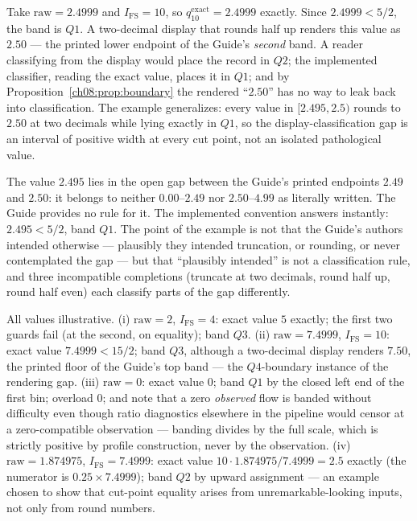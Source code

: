\begin{example}[Near-boundary value: $q_{10}^{\mathrm{exact}} = 2.4999$]\label{ch08:ex:near}
Take $\mathrm{raw} = 2.4999$ and $I_{\mathrm{FS}} = 10$, so
$q_{10}^{\mathrm{exact}} = 2.4999$ exactly. Since $2.4999 < 5/2$, the band
is $Q1$. A two-decimal display that rounds half up renders this value as
$2.50$ --- the printed lower endpoint of the Guide's \emph{second} band.
A reader classifying from the display would place the record in $Q2$; the
implemented classifier, reading the exact value, places it in $Q1$; and by
Proposition~\ref{ch08:prop:boundary} the rendered ``$2.50$'' has no way to
leak back into classification. The example generalizes: every value in
$[2.495, 2.5)$ rounds to $2.50$ at two decimals while lying exactly in
$Q1$, so the display-classification gap is an interval of positive width
at every cut point, not an isolated pathological value.
\end{example}

\begin{example}\label{ch08:ex:gap}
The value $2.495$ lies in the open gap between the Guide's printed
endpoints $2.49$ and $2.50$: it belongs to neither $0.00$--$2.49$ nor
$2.50$--$4.99$ as literally written. The Guide provides no rule for it.
The implemented convention answers instantly: $2.495 < 5/2$, band $Q1$.
The point of the example is not that the Guide's authors intended
otherwise --- plausibly they intended truncation, or rounding, or never
contemplated the gap --- but that ``plausibly intended'' is not a
classification rule, and three incompatible completions (truncate at two
decimals, round half up, round half even) each classify parts of the gap
differently.
\end{example}

\begin{example}\label{ch08:ex:more}
All values illustrative. (i) $\mathrm{raw} = 2$, $I_{\mathrm{FS}} = 4$:
exact value $5$ exactly; the first two guards fail (at the second, on
equality); band $Q3$. (ii) $\mathrm{raw} = 7.4999$,
$I_{\mathrm{FS}} = 10$: exact value $7.4999 < 15/2$; band $Q3$,
although a two-decimal display renders $7.50$, the printed floor of
the Guide's top band --- the $Q4$-boundary instance of the rendering
gap. (iii) $\mathrm{raw} = 0$: exact value $0$; band $Q1$ by the closed
left end of the first bin; overload $0$; and note that a zero
\emph{observed} flow is banded without difficulty even though ratio
diagnostics elsewhere in the pipeline would censor at a zero-compatible
observation --- banding divides by the full scale, which is strictly
positive by profile construction, never by the observation.
(iv) $\mathrm{raw} = 1.874975$, $I_{\mathrm{FS}} = 7.4999$: exact value
$10 \cdot 1.874975 / 7.4999 = 2.5$ exactly (the numerator is
$0.25 \times 7.4999$); band $Q2$ by upward assignment --- an example
chosen to show that cut-point equality arises from unremarkable-looking
inputs, not only from round numbers.
\end{example}

